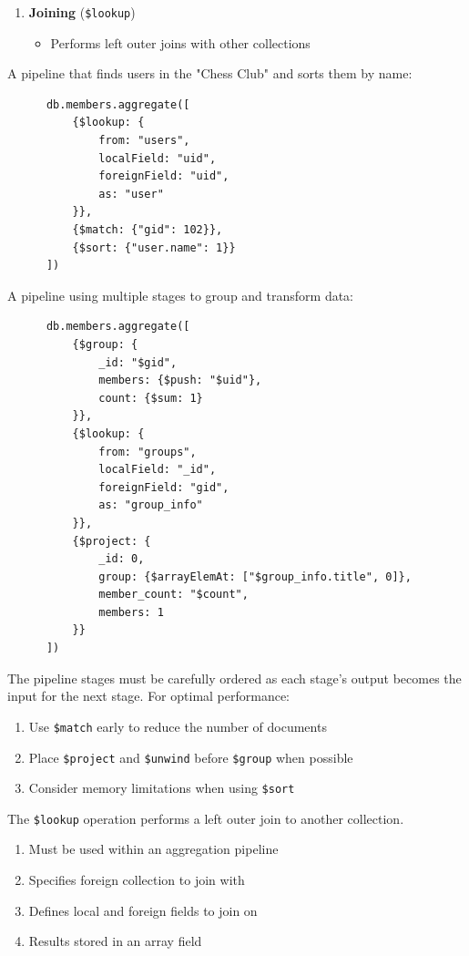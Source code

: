 \documentclass{article}
\begin{document}
\begin{enumerate}
    \item \textbf{Joining} (\texttt{\$lookup})
    \begin{itemize}
        \item Performs left outer joins with other collections
    \end{itemize}
  \end{enumerate}

  \begin{example}
    A pipeline that finds users in the "Chess Club" and sorts them by name:
    \begin{lstlisting}
      db.members.aggregate([
          {$lookup: {
              from: "users",
              localField: "uid",
              foreignField: "uid",
              as: "user"
          }},
          {$match: {"gid": 102}},
          {$sort: {"user.name": 1}}
      ])
    \end{lstlisting}
  \end{example}

  \begin{example}
    A pipeline using multiple stages to group and transform data:
    \begin{lstlisting}
      db.members.aggregate([
          {$group: {
              _id: "$gid",
              members: {$push: "$uid"},
              count: {$sum: 1}
          }},
          {$lookup: {
              from: "groups",
              localField: "_id",
              foreignField: "gid",
              as: "group_info"
          }},
          {$project: {
              _id: 0,
              group: {$arrayElemAt: ["$group_info.title", 0]},
              member_count: "$count",
              members: 1
          }}
      ])
    \end{lstlisting}
  \end{example}
  
  The pipeline stages must be carefully ordered as each stage's output becomes the input for the next stage. For optimal performance:
  \begin{enumerate}
    \item Use \texttt{\$match} early to reduce the number of documents
    \item Place \texttt{\$project} and \texttt{\$unwind} before \texttt{\$group} when possible
    \item Consider memory limitations when using \texttt{\$sort}
  \end{enumerate}

  \begin{definition}[\$lookup]
    The \texttt{\$lookup} operation performs a left outer join to another collection.
    \begin{enumerate}
      \item Must be used within an aggregation pipeline
      \item Specifies foreign collection to join with
      \item Defines local and foreign fields to join on
      \item Results stored in an array field
    \end{enumerate}
  \end{definition}
\end{document}
